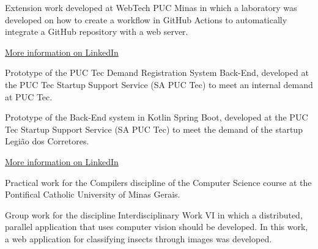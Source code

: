 \documentclass[10pt,a4paper,ragged2e,withhyper]{altacv}
\begin{document}
\begin{paracol}{2}
            Extension work developed at WebTech PUC Minas in which a laboratory was developed on how to create a workflow in GitHub Actions to automatically integrate a GitHub repository with a web server.\\
            \divider

            {\large\color{emphasis}\href{https://www.linkedin.com/in/henriquemcc/details/projects/}{More information on LinkedIn}}
        

            Prototype of the PUC Tec Demand Registration System Back-End, developed at the PUC Tec Startup Support Service (SA PUC Tec) to meet an internal demand at PUC Tec.\\
            \divider

            Prototype of the Back-End system in Kotlin Spring Boot, developed at the PUC Tec Startup Support Service (SA PUC Tec) to meet the demand of the startup Legião dos Corretores.\\
            \divider

            {\large\color{emphasis}\href{https://www.linkedin.com/in/henriquemcc/details/projects/}{More information on LinkedIn}}
        

            Practical work for the Compilers discipline of the Computer Science course at the Pontifical Catholic University of Minas Gerais.\\
            \divider

            Group work for the discipline Interdisciplinary Work VI in which a distributed, parallel application that uses computer vision should be developed. In this work, a web application for classifying insects through images was developed.\\
            \divider


\end{paracol}
\end{document}
